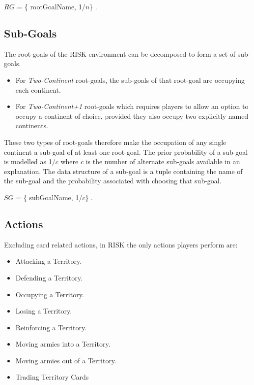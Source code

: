 \documentclass[parskip]{cs4rep}
\begin{document}
\centerline{
 $RG$ = \{ rootGoalName, 1/$n$\} .
}

\subsection{Sub-Goals}

The root-goals of the RISK environment can be decomposed to form a set of sub-goals. 

\begin{itemize}
\item
For \textit{Two-Continent} root-goals, the sub-goals of that root-goal are occupying each continent. 
\item
For \textit{Two-Continent+1} root-goals which requires players to allow an option to occupy a continent of choice, provided they also occupy two explicitly named continents. 
\end{itemize}

These two types of root-goals therefore make the occupation of any single continent a sub-goal of at least one root-goal. The prior probability of a sub-goal is modelled as 1/$c$ where $c$ is the number of alternate sub-goals available in an explanation. The data structure of a sub-goal is a tuple containing the name of the sub-goal and the probability associated with choosing that sub-goal.\newline

\centerline{
 $SG$ = \{ subGoalName, 1/$c$\} .
}

\subsection{Actions}

Excluding card related actions, in RISK the only actions players perform are:

\begin{itemize}
\item
Attacking a Territory.
\item
Defending a Territory.
\item
Occupying a Territory.
\item
Losing a Territory.
\item
Reinforcing a Territory.
\item
Moving armies into a Territory.
\item
Moving armies out of a Territory.
\item
Trading Territory Cards
\end{itemize}
\end{document}
